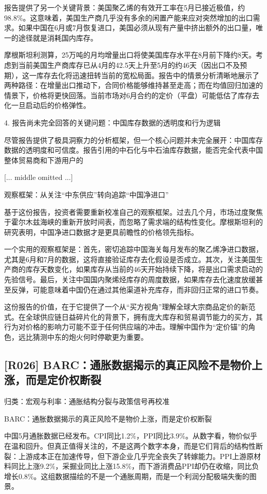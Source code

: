 \documentclass[11pt]{ctexart}
\begin{document}
报告提供了另一个关键背景：美国聚乙烯的有效开工率在5月已接近极值，约98.8\%。这意味着，美国生产商几乎没有多余的闲置产能来应对突然增加的出口需求。如果中国在6月或7月恢复进口，美国必须从现有产量中挤出额外的出口量，唯一的途径就是消耗国内库存。

摩根斯坦利测算，25万吨的月均增量出口将使美国库存水平在8月前下降约8天。考虑到当前美国生产商库存已从4月的42.5天上升至5月的约46天（因出口不及预期），这一库存去化将迅速扭转当前的宽松局面。报告中的情景分析清晰地展示了两种路径：在增量出口推动下，合同价格能够维持甚至走高；而在均值回归加速的情景下，价格将更快回落。当前市场对6月合约的定价（平盘）可能低估了库存去化一旦启动后的价格弹性。

4. 报告尚未完全回答的关键问题：中国库存数据的透明度和行为逻辑

尽管报告提供了极具洞察力的分析框架，但一个核心问题并未完全展开：中国库存数据的透明度和可信度。报告引用的中石化与中石油库存数据，能否完全代表中国整体贸易商和下游用户的

[... middle omitted ...]

观察框架：从关注“中东供应”转向追踪“中国净进口”

基于这份报告，投资者需要重新校准自己的观察框架。过去几个月，市场过度聚焦于霍尔木兹海峡的重新开放时间表，而忽略了需求端的结构性变化。摩根斯坦利的研究表明，中国净进口数据才是更具前瞻性的价格领先指标。

一个实用的观察框架是：首先，密切追踪中国海关每月发布的聚乙烯净进口数据，尤其是6月和7月的数据，这将直接验证库存去化假设是否成立。其次，关注美国生产商的库存天数变化，如果库存从当前的46天开始持续下降，将是出口需求启动的先验信号。最后，关注中国国内聚烯烃库存的周度数据，如果库存去化速度放缓甚至反弹，可能意味着中国仍在通过其他渠道补充库存，而非回归正常的进口节奏。

这份报告的价值，在于它提供了一个从“买方视角”理解全球大宗商品定价的新范式。在全球供应链日益碎片化的背景下，拥有庞大库存和贸易调节能力的买方，其行为对价格的影响力可能不亚于任何供应端的冲击。理解中国作为“定价锚”的角色，远比猜测中东的炮火何时停歇更为重要。

\subsection{[R026] BARC：通胀数据揭示的真正风险不是物价上涨，而是定价权断裂}
{\small\color{refgray}归类：宏观与利率：通胀结构分裂与政策信号再校准}

BARC：通胀数据揭示的真正风险不是物价上涨，而是定价权断裂

中国5月通胀数据已经发布。CPI同比1.2\%，PPI同比3.9\%。从数字看，物价似乎在温和回升。但真正值得关注的，不是这两个数字本身，而是它们背后的结构性断裂：上游成本正在加速传导，但下游企业几乎完全丧失了转嫁能力。PPI上游原材料同比上涨9.2\%，采掘业同比上涨15.8\%，而下游消费品PPI却仍在收缩，同比负增长0.8\%。这组数据描绘的不是一个通胀周期，而是一个利润分配极端失衡的图景。
\end{document}
